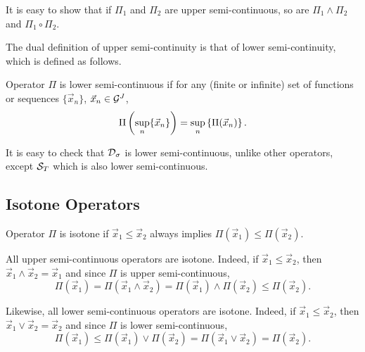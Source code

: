 It is easy to show that if $\Pi_1$ and $\Pi_2$ are upper semi-continuous, so are $\Pi_1 \wedge \Pi_2$ and $\Pi_1 \circ \Pi_2$.


The dual definition of upper semi-continuity is that of lower semi-continuity, which is defined as follows.
\begin{definition}
Operator $\Pi$ is lower semi-continuous if for any (finite or infinite) set of functions or sequences $\{ \vec{x}_n \}$,
$\vec{x}_n \in \mathcal G^{J}$,
\begin{equation}
\mylabel{eq:lsc}
\Pi \left( \sup_n \{ \vec{x}_n \} \right) =  \sup_{n} \left\{ \Pi ( \vec{x}_n) \right\}.
\end{equation}
\end{definition}

It is easy to check that $\mathcal D_{\sigma}$ is lower
semi-continuous, unlike other operators, except $\mathcal S_T$ which is
also lower semi-continuous.


\subsection{Isotone Operators}


\begin{definition}
Operator $\Pi$ is isotone if $\vec{x}_1 \leq  \vec{x}_2$ always implies $\Pi(\vec{x}_1) \leq \Pi(\vec{x}_2)$.
\end{definition}

All upper semi-continuous operators are isotone. Indeed, if $\vec{x}_1 \leq \vec{x}_2$, then  $\vec{x}_1 \wedge \vec{x}_2 =  \vec{x}_1$ and
since $\Pi$ is upper semi-continuous,
$$ \Pi(\vec{x}_1)  =  \Pi(\vec{x}_1 \wedge \vec{x}_2) =  \Pi(\vec{x}_1) \wedge \Pi(\vec{x}_2) \leq \Pi(\vec{x}_2). $$

Likewise, all lower semi-continuous operators are isotone. Indeed, if $\vec{x}_1 \leq \vec{x}_2$, then  $\vec{x}_1 \vee \vec{x}_2 =  \vec{x}_2$ and
since $\Pi$ is lower semi-continuous,
$$ \Pi(\vec{x}_1)  \leq  \Pi(\vec{x}_1) \vee \Pi(\vec{x}_2) =  \Pi(\vec{x}_1 \vee \vec{x}_2) = \Pi(\vec{x}_2). $$




